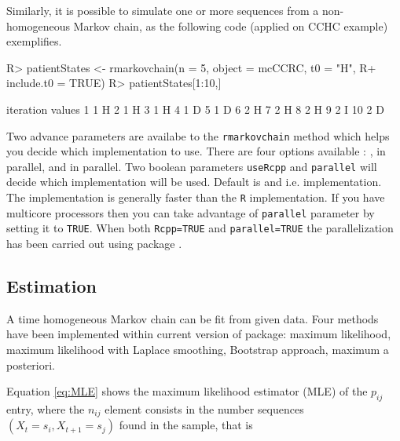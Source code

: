 \documentclass[article,nojss]{jss}
\begin{document}
Similarly, it is possible to simulate one or more sequences from a non-homogeneous Markov chain,
as the following code (applied on CCHC example) exemplifies.

\begin{CodeChunk}

\begin{CodeInput}
R> patientStates <- rmarkovchain(n = 5, object = mcCCRC, t0 = "H", 
R+                               include.t0 = TRUE)
R> patientStates[1:10,]
\end{CodeInput}

\begin{CodeOutput}
   iteration values
1          1      H
2          1      H
3          1      H
4          1      D
5          1      D
6          2      H
7          2      H
8          2      H
9          2      I
10         2      D
\end{CodeOutput}
\end{CodeChunk}

Two advance parameters are availabe to the \texttt{rmarkovchain} method which helps you decide which implementation to use. There are four options available : ,  in parallel,  and  in parallel. Two boolean parameters \texttt{useRcpp} and \texttt{parallel} will decide which implementation will be used. Default is  and  i.e.  implementation. The  implementation is generally faster than the \texttt{R} implementation. If you have multicore processors then you can take advantage of \texttt{parallel} parameter by setting it to \texttt{TRUE}. When both \texttt{Rcpp=TRUE} and \texttt{parallel=TRUE} the parallelization has been carried out using  package \citep{pkg:RcppParallel}.

\hypertarget{estimation}{%
\subsection{Estimation}\label{estimation}}

A time homogeneous Markov chain can be fit from given data. Four methods have been implemented within current version of  package: maximum likelihood, maximum likelihood with Laplace smoothing, Bootstrap approach, maximum a posteriori.

Equation \ref{eq:MLE} shows the maximum likelihood estimator (MLE) of the \(p_{ij}\) entry, where the \(n_{ij}\) element consists in the number sequences \(\left( X_{t}=s_{i}, X_{t+1}=s_{j}\right)\) found in the sample, that is
\end{document}
